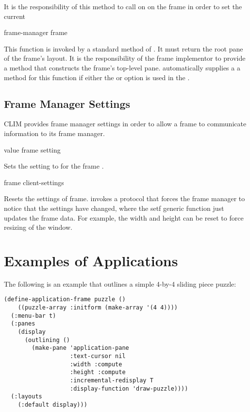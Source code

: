 {It is the responsibility of this method to call  on  on
the frame in order to set the current

 {frame-manager frame}

This function is invoked by a standard method of .  It must
return the root pane of the frame's layout.  It is the responsibility of the
frame implementor to provide a method that constructs the frame's top-level
pane.   automatically supplies a a method for this
function if either the  or  option is used in the
.


\subsection {Frame Manager Settings}

CLIM provides frame manager settings in order to allow a frame to communicate
information to its frame manager.

 {value frame setting}

Sets the setting  to  for the frame .

 {frame \rest client-settings}

Resets the settings of frame.   invokes a protocol that forces
the frame manager to notice that the settings have changed, where the setf
generic function just updates the frame data.  For example, the width and height
can be reset to force resizing of the window.


\newpage
\section {Examples of Applications}

The following is an example that outlines a simple 4-by-4 sliding piece puzzle:

\begin{verbatim}
(define-application-frame puzzle ()
    ((puzzle-array :initform (make-array '(4 4))))
  (:menu-bar t)
  (:panes
    (display
      (outlining ()
        (make-pane 'application-pane
                   :text-cursor nil
                   :width :compute
                   :height :compute
                   :incremental-redisplay T
                   :display-function 'draw-puzzle))))
  (:layouts
    (:default display)))


\end{verbatim}}
